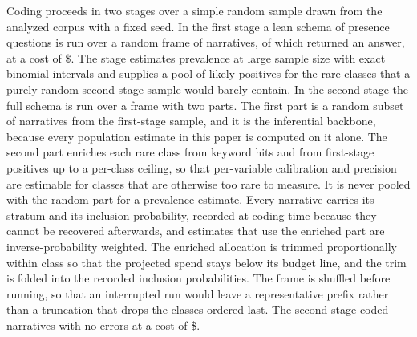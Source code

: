 Coding proceeds in two stages over a simple random sample drawn from the analyzed corpus with
a fixed seed. In the first stage a lean schema of \NLeanQuestions{} presence questions is run
over a random frame of \StageOneFrame{} narratives, of which \StageOneCoded{} returned an
answer, at a cost of \$\StageOneCost{}. The stage estimates prevalence at large sample size
with exact binomial intervals and supplies a pool of likely positives for the rare classes
that a purely random second-stage sample would barely contain. In the second stage the full
schema is run over a frame with two parts. The first part is a random subset of
\NstageTwoRandom{} narratives from the first-stage sample, and it is the inferential
backbone, because every population estimate in this paper is computed on it alone. The
second part enriches each rare class from keyword hits and from first-stage positives up to
a per-class ceiling, so that per-variable calibration and precision are estimable for classes
that are otherwise too rare to measure. It is never pooled with the random part for a
prevalence estimate. Every narrative carries its stratum and its inclusion probability,
recorded at coding time because they cannot be recovered afterwards, and estimates that use
the enriched part are inverse-probability weighted. The enriched allocation is trimmed
proportionally within class so that the projected spend stays below its budget line, and the
trim is folded into the recorded inclusion probabilities. The frame is shuffled before
running, so that an interrupted run would leave a representative prefix rather than a
truncation that drops the classes ordered last. The second stage coded \NstageTwo{}
narratives with no errors at a cost of \$\StageTwoCost{}.

